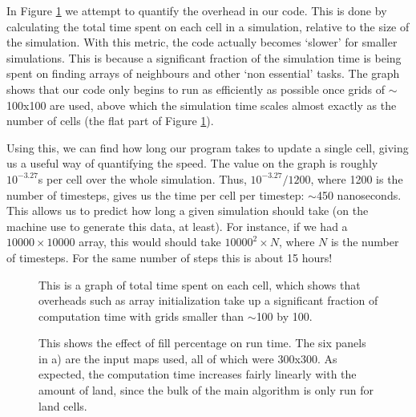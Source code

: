 	 In Figure \ref{overhead} we attempt to quantify the overhead in our code. This is done by calculating the total time spent on each cell in a 
	 simulation, relative to the size of the simulation. With this metric, the code actually becomes `slower' for smaller simulations. This is 
	 because a significant fraction of the simulation time is being spent on finding arrays of neighbours and other `non essential' tasks. The graph
	 shows that our code only begins to run as efficiently as possible once grids of $\sim$100x100 are used, above which the simulation time scales
	 almost exactly as the number of cells (the flat part of Figure \ref{overhead}).\newline{}

	 
	 Using this, we can find how long our program takes to update a single cell, giving us a useful way of quantifying the speed. The value on the 
	 graph is roughly $10^{-3.27}$s per cell over the whole simulation. Thus, $10^{-3.27}/1200$, where 1200 is the number of timesteps, gives us the 
	 time per cell per timestep: $\sim$450 nanoseconds. This allows us to predict how long a given simulation should take (on the machine use to
	 generate this data, at least). For instance, if we had a $10000\times10000$ array, this would should take $10000^{2}\times N$, where $N$ is the 
	 number of timesteps. For the same number of steps this is about 15 hours!
	 
  \begin{figure}[H]
  \begin{center}
  
  \caption{\label{overhead}This is a graph of total time spent on each cell, which shows that overheads such as array initialization
  take up a significant fraction of computation time with grids smaller than $\sim$100 by 100.}
  \end{center}
  \end{figure}
  
  \begin{figure}[H]
  \begin{center}
  \subfloat[]{}
  \caption{\label{empty}This shows the effect of fill percentage on run time. The six panels in a) are the input maps used, all of which were
  300x300. As expected, the computation time increases fairly linearly with
  the amount of land, since the bulk of the main algorithm is only run for land cells.}
  \end{center}
  \end{figure}
  
  
